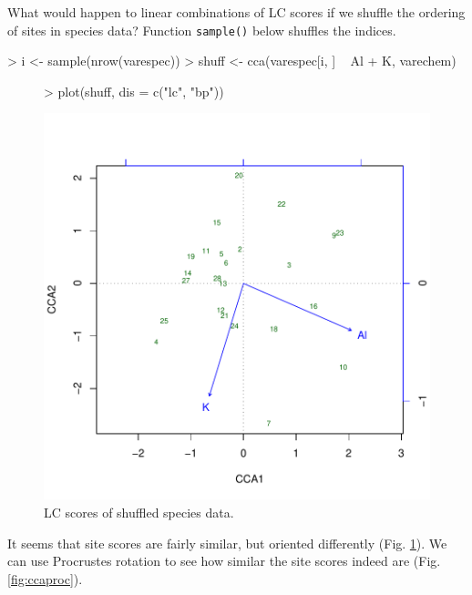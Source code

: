 \documentclass[a4paper]{article}
\begin{document}
What would happen to linear combinations of LC scores if we shuffle
the ordering of sites in species data?  Function \texttt{sample()} below
shuffles the indices. 
\begin{Schunk}
\begin{Sinput}
> i <- sample(nrow(varespec))
> shuff <- cca(varespec[i, ] ~ Al + K, varechem)
\end{Sinput}
\end{Schunk}
\begin{figure}
\begin{center}
\begin{Schunk}
\begin{Sinput}
> plot(shuff, dis = c("lc", "bp"))
\end{Sinput}
\end{Schunk}
\includegraphics{vegan-FAQ-004}
\caption{LC scores of shuffled species data.}
\label{fig:ccashuff}
\end{center}
\end{figure}
It seems that site scores are fairly similar, but oriented differently
(Fig. \ref{fig:ccashuff}).  We can use Procrustes rotation to see how
similar the site scores indeed are (Fig. \ref{fig:ccaproc}).
\end{document}
